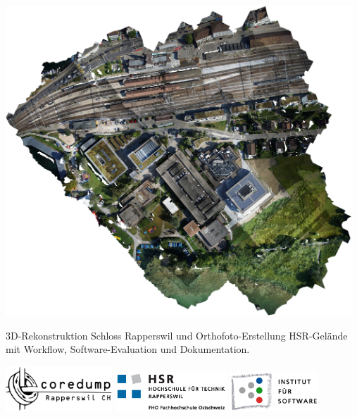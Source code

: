 
\begin{titlepage}

\begin{addmargin}[-1cm]{-3cm}
\begin{center}
\large

\hfill

\begingroup
\color{Maroon}{\LARGE\spacedallcaps{\myTitle}}\\ \bigskip %
\endgroup

\spacedlowsmallcaps{\myName} \\
\spacedlowsmallcaps{\myHackerspace}

\vspace{15mm}

\includegraphics[width=13cm]{images/odm_orthophoto} \\ %

\vspace{12mm}

3D-Rekonstruktion Schloss Rapperswil und Orthofoto-Erstellung HSR-Gelände\\
mit Workflow, Software-Evaluation und Dokumentation.

\bigskip

\myReportName

\vfill

\includegraphics[width=40mm]{images/coredump-logo.eps}
\quad\quad
\includegraphics[height=15mm]{images/HSR_Logo_CMYK}
\quad\quad
\includegraphics[height=15mm]{images/ifs-logo}


\end{center}
\end{addmargin}
\end{titlepage}
